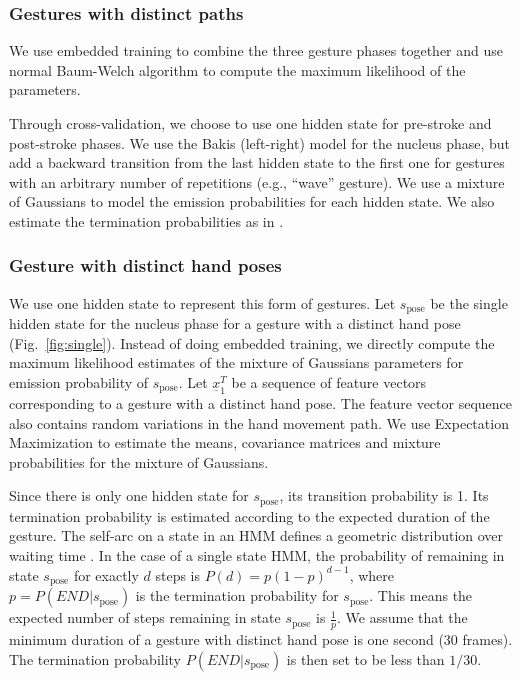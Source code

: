\subsubsection{Gestures with distinct paths}
We use embedded training to
combine the three gesture phases together and use normal Baum-Welch algorithm to compute the
maximum likelihood of the parameters. 

Through cross-validation, we choose to use one hidden state for pre-stroke and
post-stroke phases. We use the Bakis (left-right) model \cite{Bauer00} for the
nucleus phase, but add a backward transition from the last hidden state to the first
one for gestures with an arbitrary number of repetitions (e.g., ``wave''
gesture). We use a mixture of Gaussians to model the emission probabilities for
each hidden state. We also estimate the termination
probabilities as in \cite{yin13}.

\subsubsection{Gesture with distinct hand poses}
We use one hidden state to represent this form of gestures. Let
$s_{\text{pose}}$ be the single hidden state for the nucleus phase for a gesture
with a distinct hand pose (Fig.~\ref{fig:single}). Instead of doing embedded
training, we directly compute the maximum likelihood estimates of the mixture of
Gaussians parameters for emission probability of  $s_{\text{pose}}$. Let
$\underline{x}_1^T$ be a sequence of feature vectors corresponding to a gesture with a distinct hand pose. The feature vector sequence also contains random variations in the hand movement
path. 
We use Expectation Maximization to estimate the means, covariance matrices and
mixture probabilities for the mixture of Gaussians.

Since there is only one hidden state for $s_{\text{pose}}$, its transition
probability is 1. Its termination probability is estimated according to the
expected duration of the gesture. The self-arc on a state in an HMM defines a 
geometric distribution over waiting time \cite{murphy02}. In the case of a
single state HMM, the probability of remaining in state $s_{\text{pose}}$ for
exactly $d$ steps is $P(d) = p(1-p)^{d - 1}$, where $p = P(END|s_\text{pose})$
is the termination probability for $s_{\text{pose}}$. This means the expected
number of steps remaining in state $s_{\text{pose}}$ is $\frac{1}{p}$. We assume
that the minimum duration of a gesture with distinct hand pose is one second
(30 frames). The termination probability $P(END|s_\text{pose})$ is then set to
be less than $1/30$.

